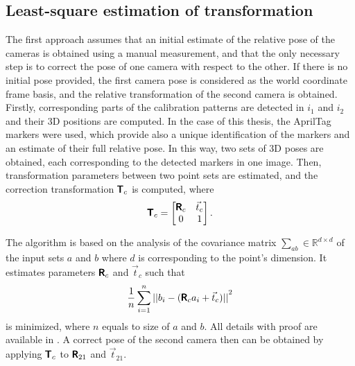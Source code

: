 \subsection{Least-square estimation of transformation}
\label{sec:lsq_umeyama}
The first approach assumes that an initial estimate of the relative pose of the cameras is obtained using a manual measurement, and that the only necessary step is to correct the pose of one camera with respect to the other.
If there is no initial pose provided, the first camera pose is considered as the world coordinate frame basis, and the relative transformation of the second camera is obtained. 
Firstly, corresponding parts of the calibration patterns are detected in $i_1$ and $i_2$ and their 3D positions are computed.
In the case of this thesis, the AprilTag markers \cite{Malyuta2019} were used, which provide also a unique identification of the markers and an estimate of their full relative pose.
In this way, two sets of 3D poses are obtained, each corresponding to the detected markers in one image.
Then, transformation parameters between two point sets are estimated, and the correction transformation $\pmb{\mathsf{T}}_{c}$ is computed, where
\begin{equation}
    \pmb{\mathsf{T}}_{c} = 
    \begin{bmatrix}
        \pmb{\mathsf{R}}_c & \vec{t}_c \\ 
        0 & 1
    \end{bmatrix}.
\end{equation}

The algorithm is based on the analysis of the covariance matrix $\sum_{ab} \in \mathbb{R}^{d \times d}$ of the input sets $a$ and $b$ where $d$ is corresponding to the point's dimension. 
It estimates parameters $\pmb{\mathsf{R}}_c$ and $\vec{t}_c$ such that
\begin{equation}
    \frac{1}{n} \sum_{i=1}^{n}{|| b_i - (\pmb{\mathsf{R}}_c a_i + \vec{t}_c) ||}^2
\end{equation}
is minimized, where $n$ equals to size of $a$ and $b$.
All details with proof are available in \cite{Umeyama1991}.
A correct pose of the second camera then can be obtained by applying $\pmb{\mathsf{T}}_{c}$ to $\pmb{\mathsf{R}}_{21}$ and $\vec{t}_{21}$.

